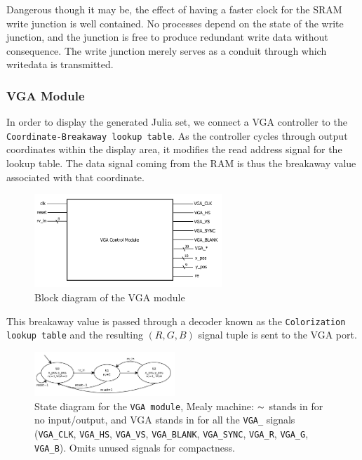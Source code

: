 \documentclass{article}
\begin{document}
Dangerous though it may be, the effect of having a faster clock for the SRAM write junction is well contained.
No processes depend on the state of the write junction, and the junction is free to produce redundant write data
without consequence. The write junction merely serves as a conduit through which writedata is transmitted.


\subsubsection{VGA Module}

In order to display the generated Julia set, we connect a VGA controller 
 to the \texttt{Coordinate-Breakaway lookup table}. As the controller cycles
through output coordinates within the display area, it modifies the
read address signal for the lookup table. The data signal coming from
the RAM is thus the breakaway value associated with that coordinate.

\begin{figure}[H]
  \centering
    \includegraphics[width=200pt]{block_diagrams/vga.pdf}
  \caption{Block diagram of the VGA module}
\end{figure}

This breakaway value is passed through a decoder known as the
\texttt{Colorization lookup table} and the resulting $(R, G, B)$ signal tuple
is sent to the VGA port.



\begin{figure}
  \centering
    \includegraphics[width=200px]{state_diagrams/vga.pdf}
  \caption{State diagram for the \texttt{VGA module}, Mealy machine: $\thicksim$
    stands in for no input/output, and VGA stands in for all the \texttt{VGA\_}
    signals (\texttt{VGA\_CLK}, \texttt{VGA\_HS}, \texttt{VGA\_VS},
    \texttt{VGA\_BLANK}, \texttt{VGA\_SYNC}, \texttt{VGA\_R}, \texttt{VGA\_G},
    \texttt{VGA\_B}). Omits unused signals for compactness.}
\end{figure}
\end{document}

